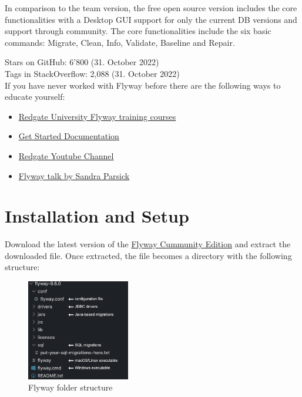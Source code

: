 In comparison to the team version, the free open source version includes the core functionalities with a Desktop GUI support for only the current DB versions and support through community. The core functionalities include the six basic commands: Migrate, Clean, Info, Validate, Baseline and Repair.

%
Stars on GitHub: 6'800 (31. October 2022)\\
Tags in StackOverflow: 2,088 (31. October 2022)\\

%
If you have never worked with Flyway before there are the following ways to educate yourself:
\begin{itemize}
	\item \href{https://www.red-gate.com/hub/university/courses/flyway}{Redgate University Flyway training courses}
	\item \href{https://flywaydb.org/documentation}{Get Started Documentation}
	\item \href{https://www.youtube.com/playlist?list=PLhFdCK734P8DYHYYWaJpzJJ-qZFZ_JTHM}{Redgate Youtube Channel}
	\item \href{https://www.youtube.com/watch?v=dzRzlDpdDW4}{Flyway talk by Sandra Parsick}
\end{itemize}

\section{Installation and Setup}
Download the latest version of the \href{https://flywaydb.org/download/community}{Flyway Cummunity Edition} and extract the downloaded file. 
Once extracted, the file becomes a directory with the following structure:

\begin{figure}[H]
    \centering
    \includegraphics[width=0.4\textwidth]{./chapters/intro_flyway/images/flyway_folder_structure}
   \caption[Flyway folder structure - Source: Own illustration]{Flyway folder structure}
\end{figure}


